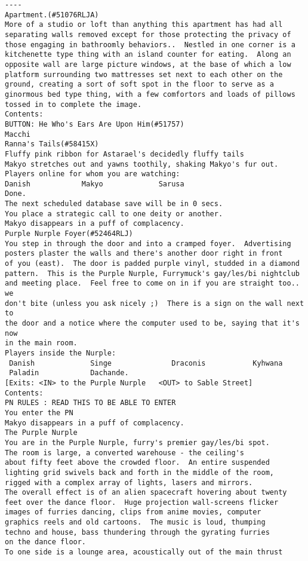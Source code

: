 \begin{verbatim}
----
Apartment.(#51076RLJA)
More of a studio or loft than anything this apartment has had all separating walls removed except for those protecting the privacy of those engaging in bathroomly behaviors..  Nestled in one corner is a kitchenette type thing with an island counter for eating.  Along an opposite wall are large picture windows, at the base of which a low platform surrounding two mattresses set next to each other on the ground, creating a sort of soft spot in the floor to serve as a ginormous bed type thing, with a few comfortors and loads of pillows tossed in to complete the image.
Contents:
BUTTON: He Who's Ears Are Upon Him(#51757)
Macchi
Ranna's Tails(#58415X)
Fluffy pink ribbon for Astarael's decidedly fluffy tails
Makyo stretches out and yawns toothily, shaking Makyo's fur out.
Players online for whom you are watching:
Danish            Makyo             Sarusa
Done.
The next scheduled database save will be in 0 secs.
You place a strategic call to one deity or another.
Makyo disappears in a puff of complacency.
Purple Nurple Foyer(#52464RLJ)
You step in through the door and into a cramped foyer.  Advertising
posters plaster the walls and there's another door right in front
of you (east).  The door is padded purple vinyl, studded in a diamond
pattern.  This is the Purple Nurple, Furrymuck's gay/les/bi nightclub
and meeting place.  Feel free to come on in if you are straight too.. we
don't bite (unless you ask nicely ;)  There is a sign on the wall next to
the door and a notice where the computer used to be, saying that it's now
in the main room.
Players inside the Nurple:
 Danish             Singe              Draconis           Kyhwana
 Paladin            Dachande.
[Exits: <IN> to the Purple Nurple   <OUT> to Sable Street]
Contents:
PN RULES : READ THIS TO BE ABLE TO ENTER
You enter the PN
Makyo disappears in a puff of complacency.
The Purple Nurple
You are in the Purple Nurple, furry's premier gay/les/bi spot.
The room is large, a converted warehouse - the ceiling's
about fifty feet above the crowded floor.  An entire suspended
lighting grid swivels back and forth in the middle of the room,
rigged with a complex array of lights, lasers and mirrors.
The overall effect is of an alien spacecraft hovering about twenty
feet over the dance floor.  Huge projection wall-screens flicker
images of furries dancing, clips from anime movies, computer
graphics reels and old cartoons.  The music is loud, thumping
techno and house, bass thundering through the gyrating furries
on the dance floor.
To one side is a lounge area, acoustically out of the main thrust

\end{verbatim}
